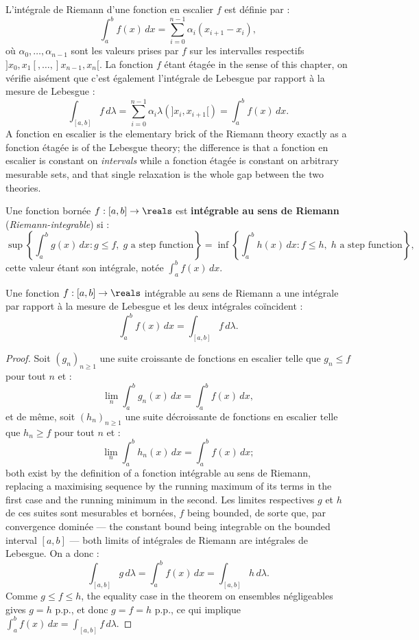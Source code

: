 L'intégrale de Riemann d'une fonction en escalier $f$ est définie par :
\[
  \int_{a}^{b} f(x) \, dx = \sum_{i=0}^{n-1} \alpha_{i} (x_{i+1} - x_{i}) ,
\]
où $\alpha_{0},\ldots,\alpha_{n-1}$ sont les valeurs prises par $f$ sur les
intervalles respectifs $]x_{0},x_{1}[, \ldots, ]x_{n-1},x_{n}[$. La fonction $f$
étant étagée in the sense of this chapter, on vérifie aisément que c'est également
l'intégrale de Lebesgue par rapport à la mesure de Lebesgue :
\[
  \int_{[a,b]} f \, d\lambda = \sum_{i=0}^{n-1} \alpha_{i}
    \lambda(]x_{i},x_{i+1}[) = \int_{a}^{b} f(x) \, dx .
\]
A fonction en escalier is the elementary brick of the Riemann theory exactly as a
fonction étagée is of the Lebesgue theory; the difference is that a fonction en
escalier is constant on \emph{intervals} while a fonction étagée is constant on
arbitrary mesurable sets, and that single relaxation is the whole gap between the
two theories.

\begin{definition}
  Une fonction bornée $f : [a,b] \to \reals$ est \textbf{intégrable au sens de
  Riemann} (\textit{Riemann-integrable}) si :
  \[
    \sup \left\{ \int_{a}^{b} g(x) \, dx : g \leq f, \; g \text{ a step function}
    \right\}
    = \inf \left\{ \int_{a}^{b} h(x) \, dx : f \leq h, \; h \text{ a step function}
    \right\} ,
  \]
  cette valeur étant son intégrale, notée $\int_{a}^{b} f(x) \, dx$.
\end{definition}

\begin{theorem}
  Une fonction $f : [a,b] \to \reals$ intégrable au sens de Riemann a une intégrale
  par rapport à la mesure de Lebesgue et les deux intégrales coïncident :
  \[
    \int_{a}^{b} f(x) \, dx = \int_{[a,b]} f \, d\lambda .
  \]
\end{theorem}

\begin{proof}
  Soit $(g_{n})_{n \geq 1}$ une suite croissante de fonctions en escalier telle que
  $g_{n} \leq f$ pour tout $n$ et :
  \[
    \lim_{n} \int_{a}^{b} g_{n}(x) \, dx = \int_{a}^{b} f(x) \, dx ,
  \]
  et de même, soit $(h_{n})_{n \geq 1}$ une suite décroissante de fonctions en
  escalier telle que $h_{n} \geq f$ pour tout $n$ et :
  \[
    \lim_{n} \int_{a}^{b} h_{n}(x) \, dx = \int_{a}^{b} f(x) \, dx ;
  \]
  both exist by the definition of a fonction intégrable au sens de Riemann, replacing
  a maximising sequence by the running maximum of its terms in the first case and
  the running minimum in the second. Les limites respectives $g$ et $h$ de ces suites
  sont mesurables et bornées, $f$ being bounded, de sorte que, par convergence
  dominée --- the constant bound being integrable on the bounded interval $[a,b]$
  --- both limits of intégrales de Riemann are intégrales de Lebesgue. On a donc :
  \[
    \int_{[a,b]} g \, d\lambda = \int_{a}^{b} f(x) \, dx
    = \int_{[a,b]} h \, d\lambda .
  \]
  Comme $g \leq f \leq h$, the equality case in the theorem on ensembles négligeables
  gives $g = h$ p.p., et donc $g = f = h$ p.p., ce qui implique $\int_{a}^{b} f(x) \,
  dx = \int_{[a,b]} f \, d\lambda$.
\end{proof}

